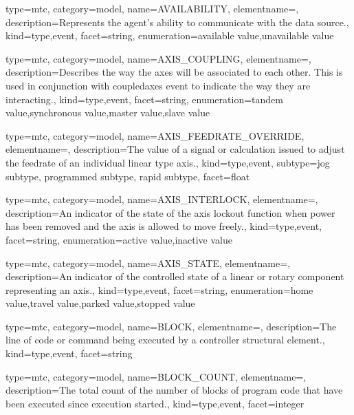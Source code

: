 {
  type=mtc,
  category=model,
  name={AVAILABILITY},
  elementname=,
  description={Represents the \gls{agent}'s ability to communicate with the data source.},
  kind={type,event},
  facet={\gls{string}},
  enumeration={\gls{available value},\gls{unavailable value}}
}


{
  type=mtc,
  category=model,
  name={AXIS\_COUPLING},
  elementname=,
  description={Describes the way the axes will be associated to each other. 
  \newline This is used in conjunction with \gls{coupledaxes event} to indicate the way they are interacting.},
  kind={type,event},
  facet={\gls{string}},
  enumeration={\gls{tandem value},\gls{synchronous value},\gls{master value},\gls{slave value}}
}


{
  type=mtc,
  category=model,
  name={AXIS\_FEEDRATE\_OVERRIDE},
  elementname=,
  description={The value of a signal or calculation issued to adjust the feedrate of an individual linear type axis.},
  kind={type,event},
  subtype={\gls{jog subtype}, \gls{programmed subtype}, \gls{rapid subtype}},
  facet={\gls{float}}
}



{
  type=mtc,
  category=model,
  name={AXIS\_INTERLOCK},
  elementname=,
  description={An indicator of the state of the axis lockout function when power has been removed and the axis is allowed to move freely.},
  kind={type,event},
  facet={\gls{string}},
  enumeration={\gls{active value},\gls{inactive value}}
}


{
  type=mtc,
  category=model,
  name={AXIS\_STATE},
  elementname=,
  description={An indicator of the controlled state of a \gls{linear} or \gls{rotary} component representing an axis.},
  kind={type,event},
  facet={\gls{string}},
  enumeration={\gls{home value},\gls{travel value},\gls{parked value},\gls{stopped value}}
}


{
  type=mtc,
  category=model,
  name={BLOCK},
  elementname=,
  description={The line of code or command being executed by a \gls{controller} \gls{structural element}.},
  kind={type,event},
  facet={\gls{string}}
}


{
  type=mtc,
  category=model,
  name={BLOCK\_COUNT},
  elementname=,
  description={The total count of the number of blocks of program code that have been executed since execution started.},
  kind={type,event},
  facet={\gls{integer}}
}


